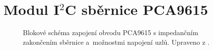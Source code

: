 \section{Modul I$^2$C sběrnice PCA9615}
\label{app:module-i2c-sbernice-pca9615}


\begin{figure}[H]
    \centering
    \def\svgwidth{\columnwidth}
    
    \caption[Blokové schéma zapojení obvodu PCA9615.]{Blokové schéma zapojení obvodu PCA9615 s impedančním zakončením sběrnice a~možnostmi napojení uzlů. Upraveno z \cite{pca9615-schema-zapojeni}.}
    \label{fig:blokove-schema-pca9615-i2c-sbernice}
\end{figure}
